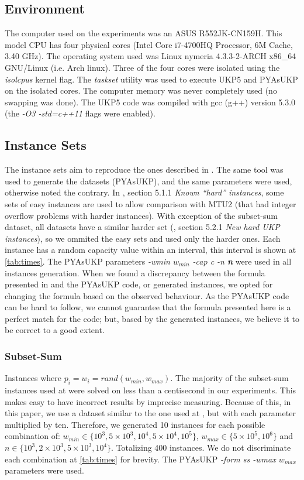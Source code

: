 \documentclass[runningheads,a4paper]{llncs}
\begin{document}
\subsection{Environment}

The computer used on the experiments was an ASUS R552JK-CN159H. This model CPU has four physical cores (Intel Core i7-4700HQ Processor, 6M Cache, 3.40 GHz). The operating system used was Linux nymeria 4.3.3-2-ARCH x86\_64 GNU/Linux (i.e. Arch linux). Three of the four cores were isolated using the \emph{isolcpus} kernel flag. The \emph{taskset} utility was used to execute UKP5 and PYAsUKP on the isolated cores. The computer memory was never completely used (no swapping was done). The UKP5 code was compiled with gcc (g++) version 5.3.0 (the \emph{-O3 -std=c++11} flags were enabled).

\subsection{Instance Sets}

The instance sets aim to reproduce the ones described in \cite{CPYA}. The same tool was used to generate the datasets (PYAsUKP), and the same parameters were used, otherwise noted the contrary. In \cite{CPYA}, section 5.1.1 \emph{Known ``hard'' instances}, some sets of easy instances are used to allow comparison with MTU2 (that had integer overflow problems with harder instances). With exception of the subset-sum dataset, all datasets have a similar harder set (\cite{CPYA}, section 5.2.1 \emph{New hard UKP instances}), so we ommited the easy sets and used only the harder ones. Each instance has a random capacity value within an interval, this interval is shown at \ref{tab:times}. The PYAsUKP parameters \emph{-wmin \(w_{min}\) -cap c -n \textbf{n}} were used in all instances generation. When we found a discrepancy between the formula presented in \cite{CPYA} and the PYAsUKP code, or generated instances, we opted for changing the formula based on the observed behaviour. As the PYAsUKP code can be hard to follow, we cannot guarantee that the formula presented here is a perfect match for the code; but, based by the generated instances, we believe it to be correct to a good extent.

\subsubsection{Subset-Sum}\label{sec:subsetsum}
Instances where \(p_i = w_i = rand(w_{min}, w_{max})\). The majority of the subset-sum instances used at \cite{CPYA} were solved on less than a centisecond in our experiments. This makes easy to have incorrect results by imprecise measuring. Because of this, in this paper, we use a dataset similar to the one used at \cite{CPYA}, but with each parameter multiplied by ten. Therefore, we generated 10 instances for each possible combination of: \(w_{min} \in \{10^3, 5\times10^3, 10^4, 5\times10^4, 10^5\}\), \(w_{max} \in \{5\times10^5, 10^6\}\) and \(n \in \{10^3, 2\times10^3, 5\times10^3, 10^4\}\). Totalizing 400 instances. We do not discriminate each combination at \ref{tab:times} for brevity. The PYAsUKP \emph{-form ss -wmax \(w_{max}\)} parameters were used.
\end{document}
